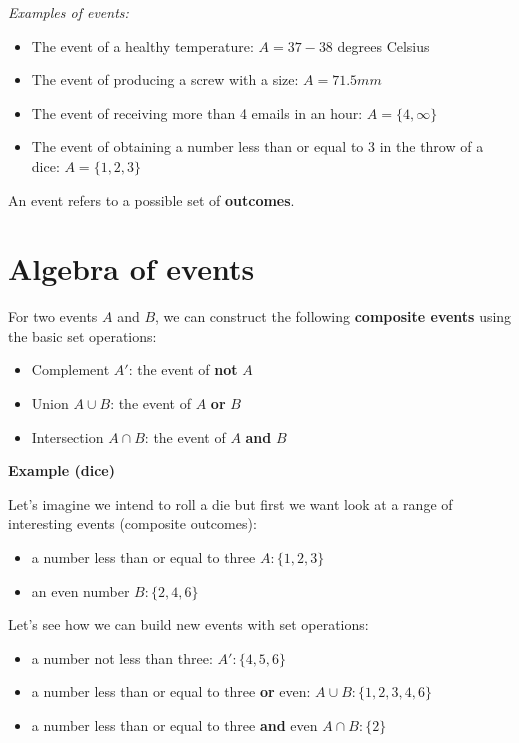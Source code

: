 \documentclass[
]{book}
\providecommand{\tightlist}{%
  \setlength{\itemsep}{0pt}\setlength{\parskip}{0pt}}
\begin{document}
\emph{Examples of events:}

\begin{itemize}
\tightlist
\item
  The event of a healthy temperature: \(A=37-38\) degrees Celsius
\item
  The event of producing a screw with a size: \(A=71.5mm\)
\item
  The event of receiving more than 4 emails in an hour: \(A= \{ 4, \infty \}\)
\item
  The event of obtaining a number less than or equal to 3 in the throw of a dice: \(A= \{ 1,2,3\}\)
\end{itemize}

An event refers to a possible set of \textbf{outcomes}.

\hypertarget{algebra-of-events}{%
\section{Algebra of events}\label{algebra-of-events}}

For two events \(A\) and \(B\), we can construct the following \textbf{composite events} using the basic set operations:

\begin{itemize}
\tightlist
\item
  Complement \(A'\): the event of \textbf{not} \(A\)
\item
  Union \(A \cup B\): the event of \(A\) \textbf{or} \(B\)
\item
  Intersection \(A \cap B\): the event of \(A\) \textbf{and} \(B\)
\end{itemize}

\textbf{Example (dice)}

Let's imagine we intend to roll a die but first we want look at a range of interesting events (composite outcomes):

\begin{itemize}
\tightlist
\item
  a number less than or equal to three \(A:\{ 1,2,3\}\)
\item
  an even number \(B:\{ 2,4,6\}\)
\end{itemize}

Let's see how we can build new events with set operations:

\begin{itemize}
\tightlist
\item
  a number not less than three: \(A':\{4,5,6\}\)
\item
  a number less than or equal to three \textbf{or} even: \(A \cup B: \{ 1,2,3,4,6\}\)
\item
  a number less than or equal to three \textbf{and} even \(A \cap B: \{ 2\}\)
\end{itemize}
\end{document}
